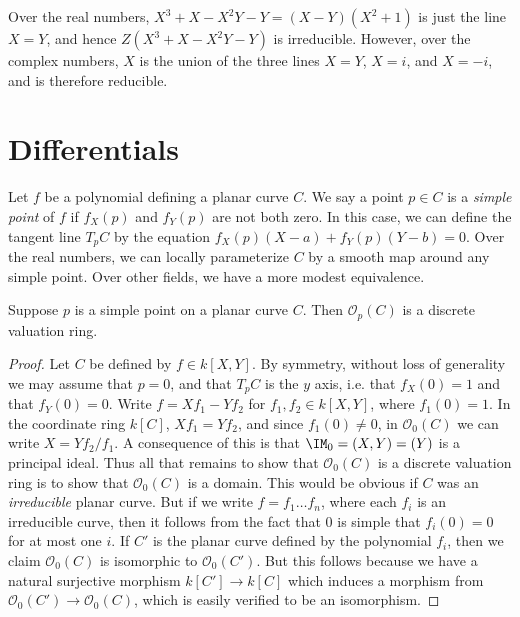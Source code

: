 \begin{example}
    Over the real numbers, $X^3 + X - X^2Y - Y = (X-Y)(X^2 + 1)$ is just the line $X = Y$, and hence $Z(X^3 + X - X^2Y - Y)$ is irreducible. However, over the complex numbers, $X$ is the union of the three lines $X = Y$, $X = i$, and $X = -i$, and is therefore reducible.
\end{example}

\section{Differentials}

Let $f$ be a polynomial defining a planar curve $C$. We say a point $p \in C$ is a \emph{simple point} of $f$ if $f_X(p)$ and $f_Y(p)$ are not both zero. In this case, we can define the tangent line $T_p C$ by the equation $f_X(p) (X - a) + f_Y(p) (Y - b) = 0$. Over the real numbers, we can locally parameterize $C$ by a smooth map around any simple point. Over other fields, we have a more modest equivalence.

\begin{theorem}
    Suppose $p$ is a simple point on a planar curve $C$. Then $\mathcal{O}_p(C)$ is a discrete valuation ring.
\end{theorem}
\begin{proof}
    Let $C$ be defined by $f \in k[X,Y]$. By symmetry, without loss of generality we may assume that $p = 0$, and that $T_p C$ is the $y$ axis, i.e. that $f_X(0) = 1$ and that $f_Y(0) = 0$. Write $f = X f_1 - Y f_2$ for $f_1,f_2 \in k[X,Y]$, where $f_1(0) = 1$. In the coordinate ring $k[C]$, $X f_1 = Y f_2$, and since $f_1(0) \neq 0$, in $\mathcal{O}_0(C)$ we can write $X = Y f_2 / f_1$. A consequence of this is that $\IM_0 = (X,Y) = (Y)$ is a principal ideal. Thus all that remains to show that $\mathcal{O}_0(C)$ is a discrete valuation ring is to show that $\mathcal{O}_0(C)$ is a domain. This would be obvious if $C$ was an \emph{irreducible} planar curve. But if we write $f = f_1 \dots f_n$, where each $f_i$ is an irreducible curve, then it follows from the fact that $0$ is simple that $f_i(0) = 0$ for at most one $i$. If $C'$ is the planar curve defined by the polynomial $f_i$, then we claim $\mathcal{O}_0(C)$ is isomorphic to $\mathcal{O}_0(C')$. But this follows because we have a natural surjective morphism $k[C'] \to k[C]$ which induces a morphism from $\mathcal{O}_0(C') \to \mathcal{O}_0(C)$, which is easily verified to be an isomorphism.
\end{proof}

